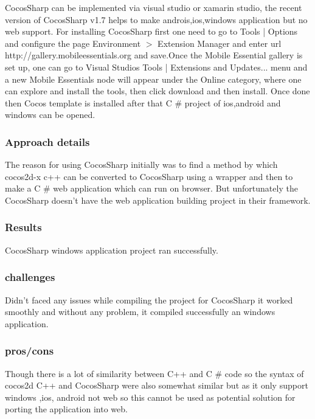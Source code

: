 \documentclass[23pt]{article}
\begin{document}
{\Large CocosSharp can be implemented via visual studio or xamarin studio, the recent version of CocosSharp v1.7 helps to make androis,ios,windows application but no web support. For installing CocosSharp first one need to go to Tools | Options and configure the page Environment \-$>$ Extension Manager and enter  url http://gallery.mobileessentials.org and save.Once the Mobile Essential gallery is set up, one can go to Visual Studios Tools | Extensions and Updates... menu and a new Mobile Essentials node will appear under the Online category, where one can explore and install the tools, then click download and then install. Once done then Cocos template is installed after that C \#  project of ios,android and windows can be opened.  \cite{cocossharp} \par}


\subsubsection{Approach details}

{\Large The reason for using CocosSharp initially was to find a method by which  cocos2d-x c++ can be converted to CocosSharp using a wrapper and then to make a C \# web application which can run on browser. But unfortunately the CocosSharp  doesn’t  have the web application building project in their framework. \par}

\subsubsection{Results}

{\Large CocosSharp windows application project ran successfully. \par}

\subsubsection{challenges}

{\Large Didn’t faced any issues while compiling the project for CocosSharp it worked smoothly and without any problem, it compiled successfully an windows application. \par}

\subsubsection{pros/cons}

{\Large Though there is a lot of similarity between C++ and C \# code so the syntax of cocos2d C++ and CocosSharp were also somewhat similar but as it only support windows ,ios, android not web so this cannot be used as potential solution for porting the application into web. \par}
\end{document}
